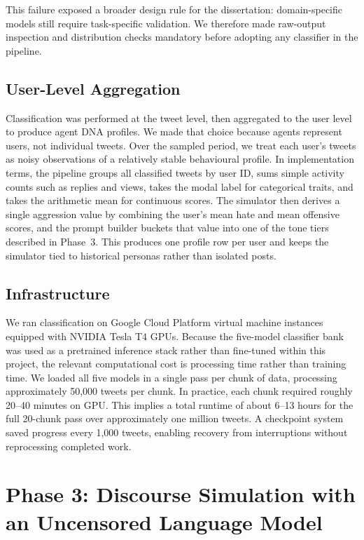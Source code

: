 \documentclass[logo,bsc,singlespacing,parskip,online]{infthesis}
\begin{document}
This failure exposed a broader design rule for the dissertation: domain-specific models still require task-specific validation. We therefore made raw-output inspection and distribution checks mandatory before adopting any classifier in the pipeline.

\subsection{User-Level Aggregation}

Classification was performed at the tweet level, then aggregated to the user level to produce agent DNA profiles. We made that choice because agents represent users, not individual tweets. Over the sampled period, we treat each user's tweets as noisy observations of a relatively stable behavioural profile. In implementation terms, the pipeline groups all classified tweets by user ID, sums simple activity counts such as replies and views, takes the modal label for categorical traits, and takes the arithmetic mean for continuous scores. The simulator then derives a single aggression value by combining the user's mean hate and mean offensive scores, and the prompt builder buckets that value into one of the tone tiers described in Phase~3. This produces one profile row per user and keeps the simulator tied to historical personas rather than isolated posts.

\subsection{Infrastructure}

We ran classification on Google Cloud Platform virtual machine instances equipped with NVIDIA Tesla T4 GPUs. Because the five-model classifier bank was used as a pretrained inference stack rather than fine-tuned within this project, the relevant computational cost is processing time rather than training time. We loaded all five models in a single pass per chunk of data, processing approximately 50,000 tweets per chunk. In practice, each chunk required roughly 20--40 minutes on GPU. This implies a total runtime of about 6--13 hours for the full 20-chunk pass over approximately one million tweets. A checkpoint system saved progress every 1,000 tweets, enabling recovery from interruptions without reprocessing completed work.

\section{Phase 3: Discourse Simulation with an Uncensored Language Model}
\end{document}
